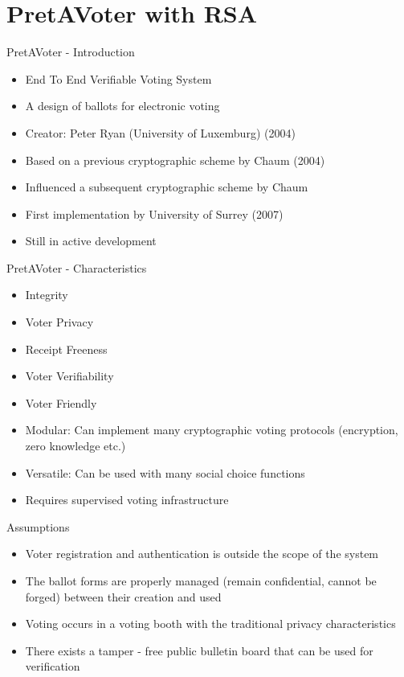 \documentclass{beamer}
\begin{document}
\section*{PretAVoter with RSA}

\begin{frame}{PretAVoter - Introduction}
\begin{itemize}
\item End To End Verifiable Voting System
\item A design of ballots for electronic voting
\item Creator: Peter Ryan (University of Luxemburg) (2004)
\item Based on a previous cryptographic scheme by Chaum (2004)
\item Influenced a subsequent cryptographic scheme by Chaum 
\item First implementation by University of Surrey (2007)
\item Still in active development
\end{itemize}
\end{frame}

\begin{frame}{PretAVoter - Characteristics}
\begin{itemize}
\item Integrity
\item Voter Privacy
\item Receipt Freeness
\item Voter Verifiability
\item Voter Friendly
\item Modular: Can implement many cryptographic voting protocols (encryption, zero knowledge etc.)
\item Versatile: Can be used with many social choice functions
\item Requires supervised voting infrastructure
\end{itemize}
\end{frame}

\begin{frame}{Assumptions}
\begin{itemize}
\item Voter registration and authentication is outside the scope of the system
\item The ballot forms are properly managed (remain confidential, cannot be forged) between their creation and used
\item Voting occurs in a voting booth with the traditional privacy characteristics
\item There exists a tamper - free public bulletin board that can be used for verification 
\end{itemize}
\end{frame}
\end{document}
